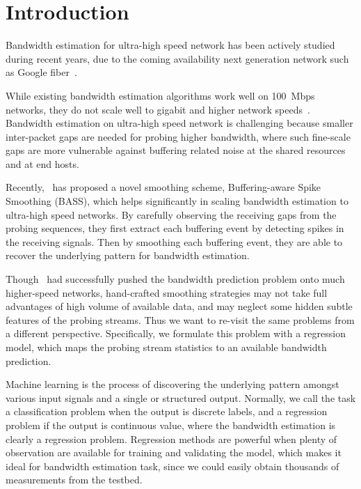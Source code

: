 \section{Introduction}
\label{sec:intro}
Bandwidth estimation for ultra-high speed network has been actively studied
during recent years, due to the coming availability next generation network
such as Google fiber~\cite{GoogleFiber}.

While existing bandwidth estimation algorithms work well on 100~Mbps networks,
they do not scale well to gigabit and higher network speeds~\cite{shriram2005}.
Bandwidth estimation on ultra-high speed network is challenging because smaller
inter-packet gaps are needed for probing higher bandwidth, where such
fine-scale gaps are more vulnerable against buffering related noise at the
shared resources and at end hosts.

Recently,~\cite{Yin2014} has proposed a novel smoothing scheme, Buffering-aware
Spike Smoothing (BASS), which helps significantly in scaling bandwidth
estimation to ultra-high speed networks. By carefully observing the receiving
gaps from the probing sequences, they first extract each buffering event by
detecting spikes in the receiving signals. Then by smoothing each buffering
event, they are able to recover the underlying pattern for bandwidth
estimation.

Though~\cite{Yin2014} had successfully pushed the bandwidth prediction problem
onto much higher-speed networks, hand-crafted smoothing strategies may not take
full advantages of high volume of available data, and may neglect some hidden
subtle features of the probing streams. Thus we want to re-visit the same
problems from a different perspective. Specifically, we
formulate this problem with a regression model, which maps the probing stream
statistics to an available bandwidth prediction.

Machine learning is the process of
discovering the underlying pattern amongst various input signals and a single
or structured output. Normally, we call the task a classification problem when
the output is discrete labels, and a regression problem if the output is
continuous value\cite{bishop2006pattern}, where the bandwidth estimation is
clearly a regression problem. Regression methods are powerful when plenty of
observation are available for training and validating the model, which makes it
ideal for bandwidth estimation task, since we could easily obtain thousands of
measurements from the testbed.

